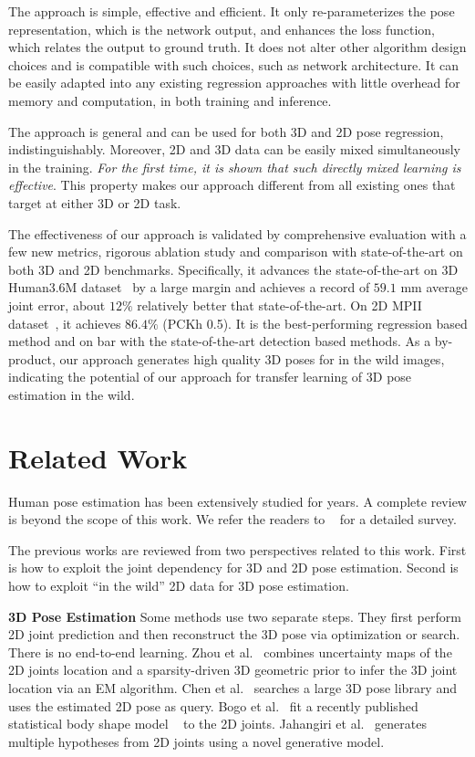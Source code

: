 \documentclass[10pt,twocolumn,letterpaper]{article}
\begin{document}
The approach is simple, effective and efficient. It only re-parameterizes the pose representation, which is the network output, and enhances the loss function, which relates the output to ground truth. It does not alter other algorithm design choices and is compatible with such choices, such as network architecture. It can be easily adapted into any existing regression approaches with little overhead for memory and computation, in both training and inference.

The approach is general and can be used for both 3D and 2D pose regression, indistinguishably. Moreover, 2D and 3D data can be easily mixed simultaneously in the training. \emph{For the first time, it is shown that such directly mixed learning is effective}. This property makes our approach different from all existing ones that target at either 3D or 2D task.

The effectiveness of our approach is validated by comprehensive evaluation with a few new metrics, rigorous ablation study and comparison with state-of-the-art on both 3D and 2D benchmarks. Specifically, it advances the state-of-the-art on 3D Human3.6M dataset~\cite{ionescu2014human3} by a large margin and achieves a record of $59.1$ mm average joint error, about $12\%$ relatively better that state-of-the-art. On 2D MPII dataset~\cite{andriluka20142d, mpiiwebpage}, it achieves $86.4\%$ (PCKh 0.5). It is the best-performing regression based method and on bar with the state-of-the-art detection based methods. As a by-product, our approach generates high quality 3D poses for in the wild images, indicating the potential of our approach for transfer learning of 3D pose estimation in the wild.

\section{Related Work}
\label{sec.related_work}

Human pose estimation has been extensively studied for years. A complete review is beyond the scope of this work. We refer the readers to ~\cite{moeslund2001survey,sarafianos20163d} for a detailed survey.

The previous works are reviewed from two perspectives related to this work. First is how to exploit the joint dependency for 3D and 2D pose estimation. Second is how to exploit ``in the wild'' 2D data for 3D pose estimation.

\textbf{3D Pose Estimation} Some methods use two separate steps. They first perform 2D joint prediction and then reconstruct the 3D pose via optimization or search. There is no end-to-end learning. Zhou et al.~\cite{zhou2016sparseness} combines uncertainty maps of the 2D joints location and a sparsity-driven 3D geometric prior to infer the 3D joint location via an EM algorithm. Chen et al.~\cite{chen20163d} searches a large 3D pose library and uses the estimated 2D pose as query. Bogo et al.~\cite{bogo2016keep} fit a recently published statistical body shape model ~\cite{loper2015smpl} to the 2D joints. Jahangiri et al.~\cite{jahangiri2017generating} generates multiple hypotheses from 2D joints using a novel generative model.
\end{document}

